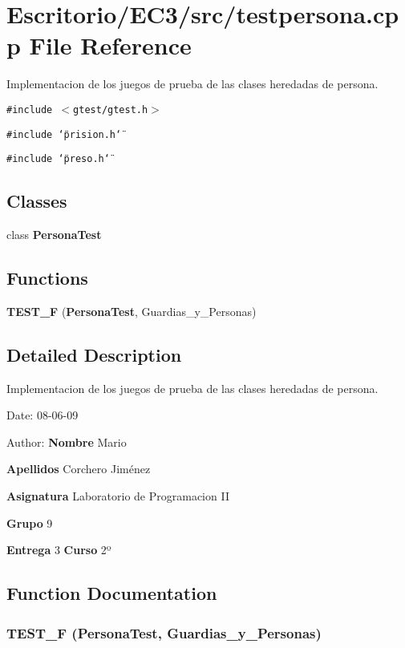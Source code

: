 \section{Escritorio/EC3/src/testpersona.cpp File Reference}
\label{testpersona_8cpp}
Implementacion de los juegos de prueba de las clases heredadas de persona. 

{\tt \#include $<$gtest/gtest.h$>$}\par
{\tt \#include \char`\"{}prision.h\char`\"{}}\par
{\tt \#include \char`\"{}preso.h\char`\"{}}\par
\subsection*{Classes}
\begin{CompactItemize}
\item 
class {\bf PersonaTest}
\end{CompactItemize}
\subsection*{Functions}
\begin{CompactItemize}
\item 
{\bf TEST\_\-F} ({\bf PersonaTest}, Guardias\_\-y\_\-Personas)
\end{CompactItemize}


\subsection{Detailed Description}
Implementacion de los juegos de prueba de las clases heredadas de persona. 

\begin{Desc}
\item[Date:]08-06-09 \end{Desc}
\begin{Desc}
\item[Author:]{\bf Nombre} Mario \par
 {\bf Apellidos} Corchero Jiménez \par
 {\bf Asignatura} Laboratorio de Programacion II \par
 {\bf Grupo} 9 \par
 {\bf Entrega} 3 {\bf Curso} 2º \end{Desc}


\subsection{Function Documentation}
\subsubsection{\setlength{\rightskip}{0pt plus 5cm}TEST\_\-F ({\bf PersonaTest}, Guardias\_\-y\_\-Personas)}\label{testpersona_8cpp_e832c38f7a727c77abcf9ea8de6c2630}


